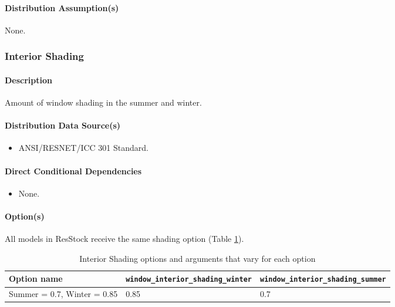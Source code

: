 \paragraph{Distribution Assumption(s)}
None.
\subsubsection{Interior Shading}\label{interior_shading}
\paragraph{Description}
Amount of window shading in the summer and winter.
\paragraph{Distribution Data Source(s)}
\begin{itemize}
 
\item
  ANSI/RESNET/ICC 301 Standard.
\end{itemize}
\paragraph{Direct Conditional Dependencies}
 
\begin{itemize}
    \item None.
\end{itemize}
\paragraph{Option(s)}
All models in ResStock receive the same shading option (Table \ref{table:hc_opt_int_shade}).
\begin{longtable}[]
{|p{4.5cm}|p{}|p{}|} \caption{Interior Shading options and arguments that vary for each option} \label{table:hc_opt_int_shade} \\  
\toprule\noalign{}
Option name &
\texttt{window\_interior\_shading\_winter} &
\texttt{window\_interior\_shading\_summer} \\
\midrule\noalign{}
\endhead
\bottomrule\noalign{}
\endlastfoot
Summer = 0.7, Winter = 0.85 & 0.85 & 0.7 \\
\end{longtable}


